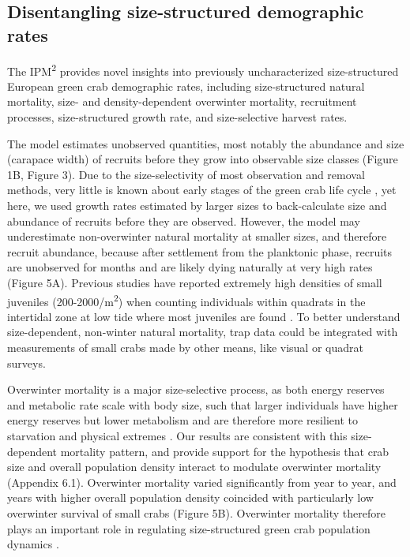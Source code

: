 \documentclass{article}
\begin{document}
\subsection{Disentangling size-structured demographic rates}

The IPM\textsuperscript{2} provides novel insights into previously uncharacterized size-structured European green crab demographic rates, including size-structured natural mortality, size- and density-dependent overwinter mortality, recruitment processes, size-structured growth rate, and size-selective harvest rates. 

The model estimates unobserved quantities, most notably the abundance and size (carapace width) of recruits before they grow into observable size classes (Figure 1B, Figure 3). Due to the size-selectivity of most observation and removal methods, very little is known about early stages of the green crab life cycle \parencite{yamada2005growth}, yet here, we used growth rates estimated by larger sizes to back-calculate size and abundance of recruits before they are observed. However, the model may underestimate non-overwinter natural mortality at smaller sizes, and therefore recruit abundance, because after settlement from the planktonic phase, recruits are unobserved for months and are likely dying naturally at very high rates (Figure 5A). Previous studies have reported extremely high densities of small juveniles (200-2000/m\textsuperscript{2}) when counting individuals within quadrats in the intertidal zone at low tide where most juveniles are found \parencite{breteler1976settlement, thiel1994recruitment}. To better understand size-dependent, non-winter natural mortality, trap data could be integrated with measurements of small crabs made by other means, like visual or quadrat surveys.

Overwinter mortality is a major size-selective process, as both energy reserves and metabolic rate scale with body size, such that larger individuals have higher energy reserves but lower metabolism and are therefore more resilient to starvation and physical extremes \parencite{carlson2008seasonal, sogard1997size}. Our results are consistent with this size-dependent mortality pattern, and provide support for the hypothesis that crab size and overall population density interact to modulate overwinter mortality (Appendix 6.1). Overwinter mortality varied significantly from year to year, and years with higher overall population density coincided with particularly low overwinter survival of small crabs (Figure 5B). Overwinter mortality therefore plays an important role in regulating size-structured green crab population dynamics \parencite{henderson1988size}. 
\end{document}
